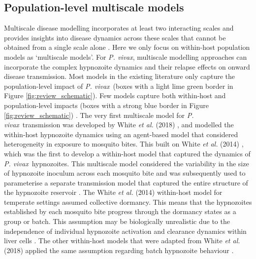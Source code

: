 \documentclass[12pt]{article}
\newcommand{\pv}{\textit{P. vivax}}
\newcommand{\etal}{\textit{et al. }}
\begin{document}
\subsection{Population-level multiscale models}
Multiscale disease modelling incorporates at least two interacting scales and provides insights into disease dynamics across these scales that cannot be obtained from a single scale alone \cite{garabed2020multi}. Here we only focus on within-host population models as `multiscale models'. For \pv, multiscale modelling approaches can incorporate the complex hypnozoite dynamics and their relapse effects on onward disease transmission. Most models in the existing literature only capture the population-level impact of \pv~(boxes with a light lime green border in Figure \ref{fig:review_schematic}). Few models capture both within-host and population-level impacts (boxes with a strong blue border in Figure \ref{fig:review_schematic}) \cite{white2014modelling,white2018mathematical,nekkab2021estimated,huber2021radical,anwar2022multiscale,white2022potential,obadia2022developing}. The very first multiscale model for \pv~transmission was developed by White \textit{et al.} (2018) \cite{white2018mathematical}, and modelled the within-host hypnozoite dynamics using an agent-based model that considered heterogeneity in exposure to mosquito bites. This built on White \etal(2014) \cite{white2014modelling}, which was the first to develop a within-host model that captured the dynamics of \pv~hypnozoites.
This multiscale model considered the variability in the size of hypnozoite inoculum across each mosquito bite and was subsequently used to parameterise a separate transmission model that captured the entire structure of the hypnozoite reservoir \cite{white2018mathematical}. The White \etal(2014) \cite{white2014modelling} within-host model for temperate settings assumed collective dormancy. This means that the hypnozoites established by each mosquito bite progress through the dormancy states as a group or batch. This assumption may be biologically unrealistic due to the independence of individual hypnozoite activation and clearance dynamics within liver cells \cite{mehra2020activation}. The other within-host models that were adapted from White \etal(2018) \cite{white2018mathematical} applied the same assumption regarding batch hypnozoite behaviour \cite{ huber2021radical,nekkab2021estimated,obadia2022developing,white2022potential}. 
\end{document}
